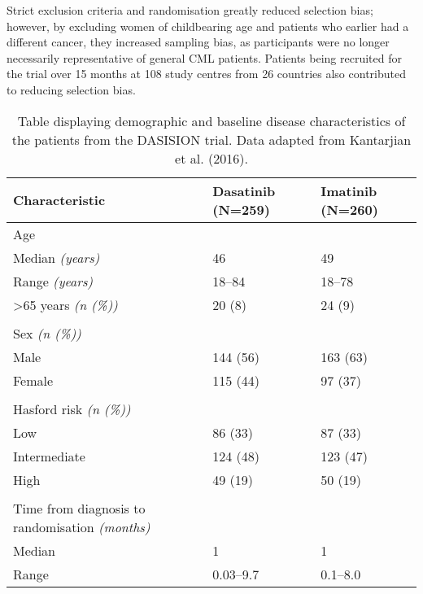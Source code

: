 Strict exclusion criteria and randomisation greatly reduced selection bias; however, by excluding women of childbearing age and patients who earlier had a different cancer, they increased sampling bias, as participants were no longer necessarily representative of general CML patients. Patients being recruited for the trial over 15 months at 108 study centres from 26 countries also contributed to reducing selection bias.

\begin{table}
\centering
\caption{Table displaying demographic and baseline disease characteristics of the patients from the DASISION trial. Data adapted from Kantarjian et al. (2016).}
\begin{tabu} to 0.475\textwidth {X[3]XX}
   \toprule
Characteristic & Dasatinib (N=259)  & Imatinib (N=260)   \\
\midrule
 Age & & \\
\hspace{3mm} Median \textit{{(}years{)}} & 46 & 49 \\
\hspace{3mm} Range \textit{{(}years{)}} & 18--84 & 18--78 \\
\hspace{3mm} >65 years \textit{{(}n (\%){)}} & 20 (8) & 24 (9) \\

& & \\

Sex \textit{{(}n (\%){)}} & & \\
\hspace{3mm} Male  & 144 (56) & 163 (63) \\
\hspace{3mm} Female & 115 (44) & 97 (37) \\

& & \\

Hasford risk \textit{{(}n (\%){)}} & & \\
\hspace{3mm} Low  & 86 (33) & 87 (33) \\
\hspace{3mm} Intermediate & 124 (48) & 123 (47) \\
\hspace{3mm} High & 49 (19) & 50 (19) \\

& & \\

Time from diagnosis to randomisation \textit{{(}months{)}} & & \\
\hspace{3mm} Median  & 1 & 1 \\
\hspace{3mm} Range & 0.03--9.7 & 0.1--8.0 \\


\end{tabu}
\end{table}
